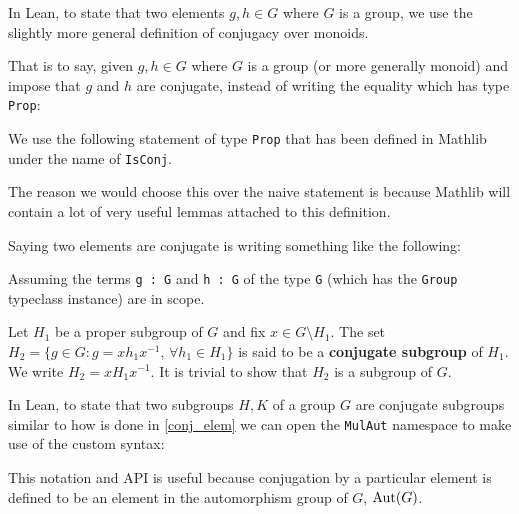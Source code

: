 \begin{remark}
\label{conj_elem}
In Lean, to state that two elements $g, h \in G$ where $G$ is a group, we use the slightly more general definition of conjugacy over monoids.

That is to say, given $g, h \in G$ where $G$ is a group (or more generally monoid) and impose that $g$ and $h$ are conjugate, instead of writing the equality which has type \texttt{Prop}:


We use the following statement of type \texttt{Prop} that has been defined in Mathlib under the name of \texttt{IsConj}.

The reason we would choose this over the naive statement is because Mathlib will contain a lot of very useful lemmas attached to this definition.

Saying two elements are conjugate is writing something like the following:

Assuming the terms \texttt{g : G} and \texttt{h : G} of the type \texttt{G} (which has the \texttt{Group} typeclass instance) are in scope.



\begin{definition}
Let $H_1$ be a proper subgroup of $G$ and fix $x \in G \setminus H_1$. The set $H_2 = \{g \in G : g= xh_1x^{-1}$, $\forall h_1 \in H_1\}$ is said to be a \textbf{conjugate subgroup} of $H_1$. We write $H_2 = xH_1x^{-1}$. It is trivial to show that $H_2$ is a subgroup of $G$.
\end{definition}

\begin{remark}
In Lean, to state that two subgroups $H, K$ of a group $G$ are conjugate subgroups similar to how is done in \ref{conj_elem} we can open the \texttt{MulAut} namespace to make use of the custom syntax:


This notation and API is useful because conjugation by a particular element is defined to be an element in the automorphism group of $G$, $\operatorname{Aut}(G)$. 


\end{remark}
\end{remark}
